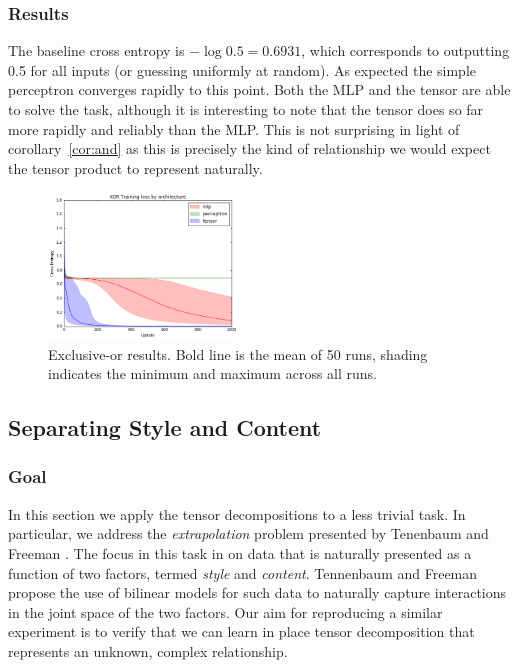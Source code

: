 \subsubsection{Results}
The baseline cross entropy is \(-\log0.5 = 0.6931\), which corresponds to outputting
0.5 for all inputs (or guessing uniformly at random). 
As expected the simple perceptron
converges rapidly to this point. Both the MLP and the tensor are able to solve the task,
although it is interesting to note that the
tensor does so far more rapidly and reliably than the MLP. This is not surprising in light of
corollary~\ref{cor:and} as this is precisely the kind of relationship we would expect the tensor
product to represent naturally.

\begin{figure}
\centering
\includegraphics[width=0.45\textwidth]{tensors/xor}
 \caption[XOR results]{Exclusive-or results. Bold line is the mean of 50 runs, shading indicates the
minimum and maximum across all runs.}
\end{figure}

\subsection{Separating Style and Content}
\subsubsection{Goal}
In this section we apply the tensor decompositions to a less trivial task. In particular, we
address the \textit{extrapolation} problem presented by Tenenbaum and 
Freeman \autocite{Tenenbaum2000}. The focus in this task in on data that is naturally presented as a
function of two factors, termed \emph{style} and \emph{content}. Tennenbaum and Freeman
propose the use of bilinear models for such data to naturally capture 
interactions in the joint space of the two
factors. Our aim for reproducing a similar experiment is to verify that we
can learn in place tensor decomposition that represents an unknown, complex relationship.


